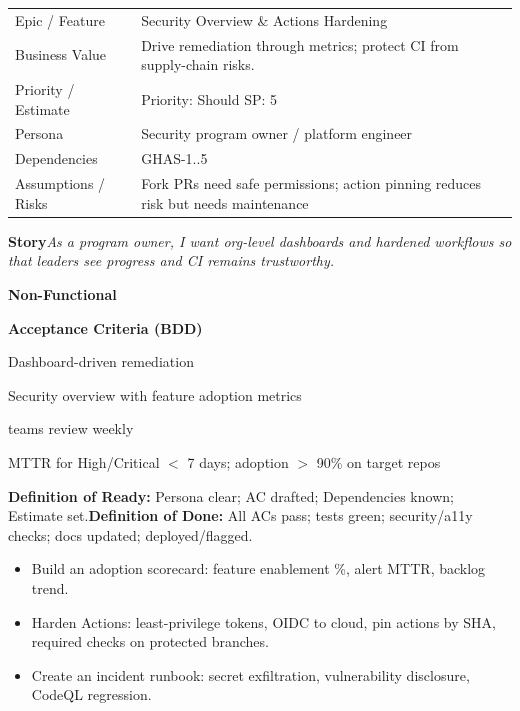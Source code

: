\documentclass[11pt,a4paper]{article}
\newcommand{\cb}{\(\square\)}
\newenvironment{GHASCard}[2]{%
  \begin{tcolorbox}[ghascard,title={\ghasheader{#1 --- #2}}]
  \small
}{%
  \end{tcolorbox}
}
\newenvironment{GHASTasks}{%
  \begin{tcolorbox}[ghastasks]
  \small
  \begin{itemize}[label=\cb, leftmargin=*, labelsep=0.6em]
}{%
  \end{itemize}
  \end{tcolorbox}
}
\newcommand{\DoR}{\textbf{Definition of Ready:} Persona clear; AC drafted; Dependencies known; Estimate set.}
\newcommand{\DoD}{\textbf{Definition of Done:} All ACs pass; tests green; security/a11y checks; docs updated; deployed/flagged.}
\begin{document}
\begin{GHASCard}{GHAS-6}{Org Reporting \& Workflow Hardening}
\begin{tabularx}{\linewidth}{L V}
Epic / Feature & Security Overview \& Actions Hardening \tabularnewline
Business Value & Drive remediation through metrics; protect CI from supply-chain risks. \tabularnewline
Priority / Estimate & Priority: Should \quad SP: 5 \tabularnewline
Persona & Security program owner / platform engineer \tabularnewline
Dependencies & GHAS-1..5 \tabularnewline
Assumptions / Risks & Fork PRs need safe permissions; action pinning reduces risk but needs maintenance \tabularnewline
\end{tabularx}

\medskip
\textbf{Story}\quad \emph{As a program owner, I want org-level dashboards and hardened workflows so that leaders see progress and CI remains trustworthy.}

\medskip
\textbf{Non-Functional}\quad
{}\ \ 

\medskip
\textbf{Acceptance Criteria (BDD)}
\begin{description}[leftmargin=2.7cm, labelwidth=2.6cm, style=nextline]
  \item[\textbf{Scenario}] Dashboard-driven remediation
  \item[\textbf{Given}] Security overview with feature adoption metrics
  \item[\textbf{When}] teams review weekly
  \item[\textbf{Then}] MTTR for High/Critical $<$ 7 days; adoption $>$ 90\% on target repos
\end{description}

\medskip
\DoR\quad\textbullet\quad\DoD
\end{GHASCard}

\begin{GHASTasks}
\item Build an adoption scorecard: feature enablement \%, alert MTTR, backlog trend.
\item Harden Actions: least-privilege tokens, OIDC to cloud, pin actions by SHA, required checks on protected branches.
\item Create an incident runbook: secret exfiltration, vulnerability disclosure, CodeQL regression.
\end{GHASTasks}
\clearpage
\end{document}
